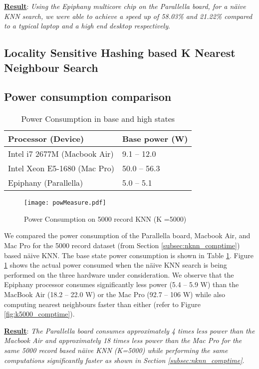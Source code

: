 \textbf{\underline{Result}}: \textit{Using the Epiphany multicore chip on the Parallella board, for a n\"{a}ive KNN search, we were able to achieve a speed up of 58.03\% and 21.22\% compared to a typical laptop and a high end desktop respectively}.

\subsection{Locality Sensitive Hashing based K Nearest Neighbour Search}
\label{subsec:lsh_knn_meas}

\subsection{Power consumption comparison}
\label{subsec:power_cons_comp}
\begin{table}
\caption{Power Consumption in base and high states}
\centering
\begin{tabular}{| l | l |}
\hline
\textbf{Processor (Device)} & \textbf{Base power (W)}\\
\hline
Intel i7 2677M (Macbook Air) & 9.1 -- 12.0\\
\hline
Intel Xeon E5-1680 (Mac Pro) & 50.0 -- 56.3\\
\hline
Epiphany (Parallella) & 5.0 -- 5.1 \\
\hline
\end{tabular}
\label{table:power_states}
\end{table}

\begin{figure}[!ht]
\centering
\texttt{[image: powMeasure.pdf]}
\caption{Power Consumption on 5000 record KNN (K =5000)}
\label{fig:pow_cons}
\end{figure}
We compared the power consumption of the Parallella board, Macbook Air, and Mac Pro for the 5000 record dataset (from Section \ref{subsec:nknn_comptime}) based n\"{a}ive KNN. The base state power consumption is shown in Table \ref{table:power_states}. Figure \ref{fig:pow_cons} shows the actual power consumed when the n\"{a}ive KNN search is being performed on the three hardware under consideration. We observe that the Epiphany processor consumes significantly less power (5.4 -- 5.9 W) than the MacBook Air (18.2 -- 22.0 W) or the Mac Pro (92.7 -- 106 W) while also computing nearest neighbours faster than either (refer to Figure \ref{fig:k5000_comptime}). 

\textbf{\underline{Result}}: \textit{The Parallella board consumes approximately 4 times less power than the Macbook Air and approximately 18 times less power than the Mac Pro for the same 5000 record based n\"{a}ive KNN (K=5000) while performing the same computations significantly faster as shown in Section \ref{subsec:nknn_comptime}}.